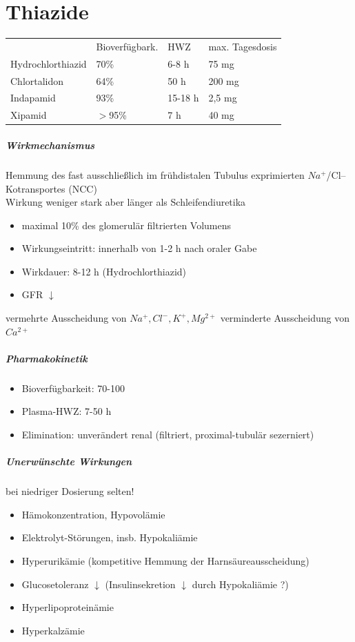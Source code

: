 \documentclass[10pt,a4paper]{report}
\begin{document}
\section{Thiazide}
\begin{tabularx}{\textwidth}{XXXX}
&Bioverfügbark.&HWZ&max. Tagesdosis\\ 
Hydrochlorthiazid&70\%&6-8 h&75 mg\\
Chlortalidon&64\%&50 h&200 mg\\
Indapamid&93\%&15-18 h&2,5 mg\\
Xipamid&$>$95\%&7 h&40 mg\\
\end{tabularx}
\subparagraph{Wirkmechanismus}
Hemmung des fast ausschließlich im frühdistalen Tubulus exprimierten $Na^+$/Cl--Kotransportes (NCC)\\
Wirkung weniger stark aber länger als Schleifendiuretika\\
\begin{itemize}
	\item maximal 10\% des glomerulär 	filtrierten  Volumens
	\item Wirkungseintritt: innerhalb von 1-2 h nach oraler Gabe
	\item Wirkdauer: 8-12 h (Hydrochlorthiazid) 
	\item GFR $\downarrow$ 
\end{itemize}
vermehrte Ausscheidung von $Na^+, Cl^-, K^+, Mg^{2+}$ verminderte Ausscheidung von $Ca^{2+}$
\subparagraph{Pharmakokinetik}
\begin{itemize}
	\item Bioverfügbarkeit: 70-100 %
	\item Plasma-HWZ: 7-50 h
	\item Elimination: unverändert renal (filtriert, proximal-tubulär sezerniert)
\end{itemize}
\subparagraph{Unerwünschte Wirkungen}
bei niedriger Dosierung selten!
\begin{itemize}
	\item Hämokonzentration, Hypovolämie
	\item Elektrolyt-Störungen, insb. Hypokaliämie
	\item Hyperurikämie (kompetitive Hemmung der Harnsäureausscheidung)
	\item Glucosetoleranz $\downarrow$ (Insulinsekretion $\downarrow$ durch Hypokaliämie ?)
	\item Hyperlipoproteinämie
	\item Hyperkalzämie
\end{itemize}
\end{document}
